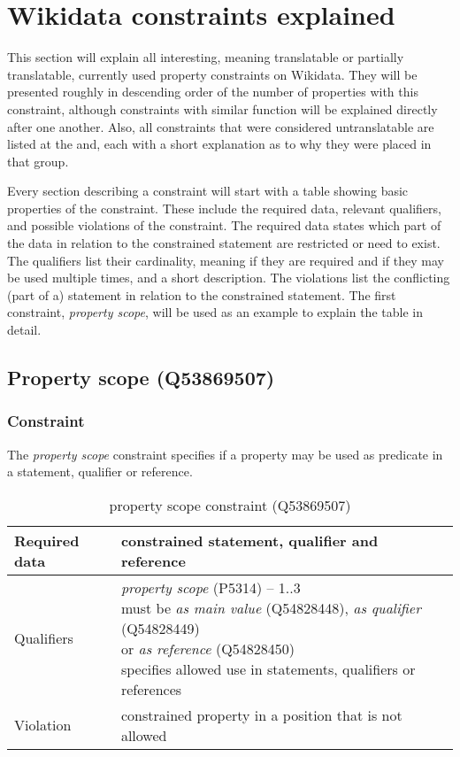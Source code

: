 \documentclass[hyperref,bachelorofscience,fleqn]{cgvpub}
\begin{document}
\section{Wikidata constraints explained}
This section will explain all interesting, meaning translatable or partially translatable, currently used property constraints on Wikidata. They will be presented roughly in descending order of the number of properties with this constraint, although constraints with similar function will be explained directly after one another. Also, all constraints that were considered untranslatable are listed at the and, each with a short explanation as to why they were placed in that group.

Every section describing a constraint will start with a table showing basic properties of the constraint. These include the required data, relevant qualifiers, and possible violations of the constraint. The required data states which part of the data in relation to the constrained statement are restricted or need to exist. The qualifiers list their cardinality, meaning if they are required and if they may be used multiple times, and a short description. The violations list the conflicting (part of a) statement in relation to the constrained statement. The first constraint, \emph{property scope}, will be used as an example to explain the table in detail.

\subsection{Property scope (Q53869507)}
\subsubsection{Constraint}
The \emph{property scope} constraint specifies if a property may be used as predicate in a statement, qualifier or reference.
\begin{table}[H]
\caption{property scope constraint (Q53869507)}
\begin{tabularx}{\textwidth}{ ll X}
\hline
Required data & constrained statement, qualifier and reference \\
\hline
Qualifiers & \makecell{\emph{property scope} (P5314) -- 1..3 \\ must be \emph{as main value} (Q54828448), \emph{as qualifier} (Q54828449) \\ or \emph{as reference} (Q54828450) \\ specifies allowed use in statements, qualifiers or references} \\
\hline
Violation & constrained property in a position that is not allowed \\
\hline
\end{tabularx}
\end{table}
\end{document}
